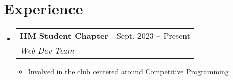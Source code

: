 \documentclass[letterpaper,11pt]{article}
\makeatletter
\newcommand{\resumeItem}[1]{
  \item\small{
    {#1 \vspace{-2pt}}
  }
}
\newcommand{\resumeSubheading}[4]{
  \vspace{-2pt}\item
    \begin{tabular*}{0.97\textwidth}[t]{l@{\extracolsep{\fill}}r}
      \textbf{#1} & #2 \\
      \textit{\small#3} & \textit{\small #4} \\
    \end{tabular*}\vspace{-7pt}
}
\newcommand{\resumeSubHeadingListStart}{\begin{itemize}[leftmargin=0.15in, label={}]}
\newcommand{\resumeSubHeadingListEnd}{\end{itemize}}
\newcommand{\resumeItemListStart}{\begin{itemize}}
\newcommand{\resumeItemListEnd}{\end{itemize}\vspace{-5pt}}
\makeatother
\begin{document}
\section{Experience}
  \resumeSubHeadingListStart

        \resumeSubheading
        {\textbf{IIM Student Chapter}}{Sept. 2023 -- Present}
        {\footnotesize\emph{Web Dev Team}}{}
        \resumeItemListStart
            \resumeItem{Involved in the club centered around Competitive Programming}
        \resumeItemListEnd
        
  \resumeSubHeadingListEnd 
\end{document}
